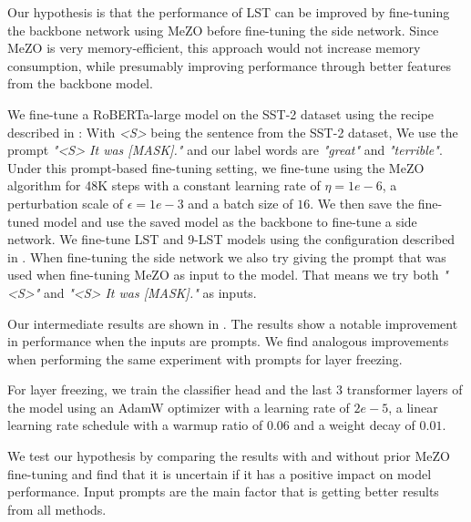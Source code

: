 Our hypothesis is that the performance of LST can be improved by fine-tuning the backbone network using MeZO before fine-tuning the side network. Since MeZO is very memory-efficient, this approach would not increase memory consumption, while presumably improving performance through better features from the backbone model.  

We fine-tune a RoBERTa-large model on the SST-2 dataset using the recipe described in \cite{mezo}: With \textit{<S>} being the sentence from the SST-2 dataset, We use the prompt \textit{"<S> It was [MASK]."} and our label words are \textit{"great"} and \textit{"terrible"}. Under this prompt-based fine-tuning setting, we fine-tune using the MeZO algorithm for 48K steps with a constant learning rate of $\eta = 1e-6$, a perturbation scale of $\epsilon = 1e-3$ and a batch size of $16$. We then save the fine-tuned model and use the saved model as the backbone to fine-tune a side network.
We fine-tune LST and 9-LST models using the configuration described in . When fine-tuning the side network we also try giving the prompt that was used when fine-tuning MeZO as input to the model. That means we try both \textit{"<S>"} and 
\textit{"<S> It was [MASK]."} as inputs.

Our intermediate results are shown in . The results show a notable improvement in performance when the inputs are prompts. We find analogous improvements when performing the same experiment with prompts for layer freezing.

For layer freezing, we train the classifier head and the last 3 transformer layers of the model using an AdamW optimizer with a learning rate of $2e-5$, a linear learning rate schedule with a warmup ratio of $0.06$ and a weight decay of $0.01$. 

We test our hypothesis by comparing the results with and without prior MeZO fine-tuning and find that it is uncertain if it has a positive impact on model performance. Input prompts are the main factor that is getting better results from all methods.
